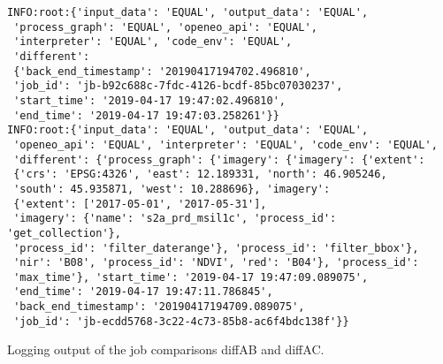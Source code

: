 \documentclass[draft,final]{vutinfth} %
\newenvironment{code}{\captionsetup{type=listing}}{}
\begin{document}

\begin{code}
	\begin{verbatim}
INFO:root:{'input_data': 'EQUAL', 'output_data': 'EQUAL', 
 'process_graph': 'EQUAL', 'openeo_api': 'EQUAL', 
 'interpreter': 'EQUAL', 'code_env': 'EQUAL',
 'different': 
 {'back_end_timestamp': '20190417194702.496810', 
 'job_id': 'jb-b92c688c-7fdc-4126-bcdf-85bc07030237', 
 'start_time': '2019-04-17 19:47:02.496810', 
 'end_time': '2019-04-17 19:47:03.258261'}} 
INFO:root:{'input_data': 'EQUAL', 'output_data': 'EQUAL', 
 'openeo_api': 'EQUAL', 'interpreter': 'EQUAL', 'code_env': 'EQUAL',
 'different': {'process_graph': {'imagery': {'imagery': {'extent': 
 {'crs': 'EPSG:4326', 'east': 12.189331, 'north': 46.905246, 
 'south': 45.935871, 'west': 10.288696}, 'imagery': 
 {'extent': ['2017-05-01', '2017-05-31'], 
 'imagery': {'name': 's2a_prd_msil1c', 'process_id': 'get_collection'}, 
 'process_id': 'filter_daterange'}, 'process_id': 'filter_bbox'}, 
 'nir': 'B08', 'process_id': 'NDVI', 'red': 'B04'}, 'process_id': 
 'max_time'}, 'start_time': '2019-04-17 19:47:09.089075', 
 'end_time': '2019-04-17 19:47:11.786845', 
 'back_end_timestamp': '20190417194709.089075', 
 'job_id': 'jb-ecdd5768-3c22-4c73-85b8-ac6f4bdc138f'}}
	\end{verbatim}
	\caption{Logging output of the job comparisons diffAB and diffAC.}
	\label{lst:use_case3_logfile}
\end{code}
\end{document}

